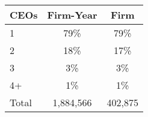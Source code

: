 \begin{tabular}{lcc}
\toprule
CEOs & Firm-Year & Firm \\
\midrule
1 & 79\% & 79\% \\
2 & 18\% & 17\% \\
3 & 3\% & 3\% \\
4+ & 1\% & 1\% \\
Total &    1,884,566 &      402,875 \\
\bottomrule
\end{tabular}
